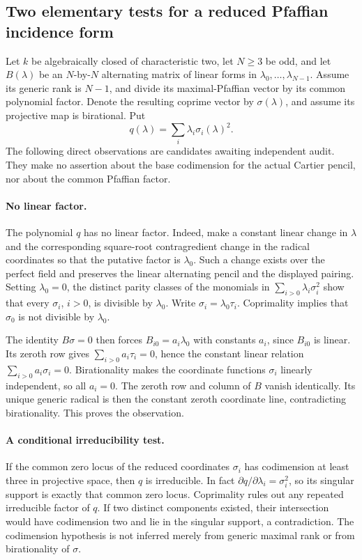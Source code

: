 \subsection*{Two elementary tests for a reduced Pfaffian incidence form}

Let \(k\) be algebraically closed of characteristic two, let \(N\ge3\)
be odd, and let \(B(\lambda)\) be an \(N\)-by-\(N\) alternating
matrix of linear forms in \(\lambda_0,\ldots,\lambda_{N-1}\).
Assume its generic rank is \(N-1\), and divide its maximal-Pfaffian
vector by its common polynomial factor.  Denote the resulting
coprime vector by \(\sigma(\lambda)\), and assume its projective
map is birational.  Put
\[
                    q(\lambda)=\sum_i\lambda_i\sigma_i(\lambda)^2.
\]
The following direct observations are candidates awaiting independent
audit.  They make no assertion about the base codimension for the
actual Cartier pencil, nor about the common Pfaffian factor.

\paragraph{No linear factor.}
The polynomial \(q\) has no linear factor.  Indeed, make a constant
linear change in \(\lambda\) and the corresponding square-root
contragredient change in the radical coordinates so that the
putative factor is \(\lambda_0\).  Such a change exists over the
perfect field and preserves the linear alternating pencil and
the displayed pairing.  Setting \(\lambda_0=0\), the distinct
parity classes of the monomials in
\(\sum_{i>0}\lambda_i\sigma_i^2\) show that every
\(\sigma_i\), \(i>0\), is divisible by \(\lambda_0\).
Write \(\sigma_i=\lambda_0\tau_i\).  Coprimality implies that
\(\sigma_0\) is not divisible by \(\lambda_0\).

The identity \(B\sigma=0\) then forces
\(B_{i0}=a_i\lambda_0\) with constants \(a_i\), since
\(B_{i0}\) is linear.  Its zeroth row gives
\(\sum_{i>0}a_i\tau_i=0\), hence the constant linear relation
\(\sum_{i>0}a_i\sigma_i=0\).  Birationality makes the coordinate
functions \(\sigma_i\) linearly independent, so all \(a_i=0\).
The zeroth row and column of \(B\) vanish identically.  Its unique
generic radical is then the constant zeroth coordinate line,
contradicting birationality.  This proves the observation.

\paragraph{A conditional irreducibility test.}
If the common zero locus of the reduced coordinates \(\sigma_i\)
has codimension at least three in projective space, then \(q\)
is irreducible.  In fact
\(\partial q/\partial\lambda_i=\sigma_i^2\), so its singular
support is exactly that common zero locus.  Coprimality rules out
any repeated irreducible factor of \(q\).  If two distinct
components existed, their intersection would have codimension two
and lie in the singular support, a contradiction.  The codimension
hypothesis is not inferred merely from generic maximal rank or
from birationality of \(\sigma\).

